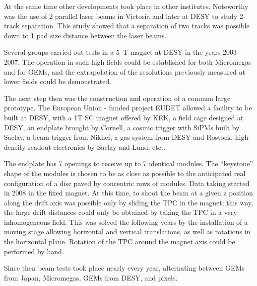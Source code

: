 At the same time other developments took place in other institutes. Noteworthy was the use of 2 parallel laser beams in Victoria and later at DESY to study 2-track separation. This study showed that a separation of two tracks was possible down to 1 pad size distance between the laser beams.

Several groups carried out tests in a \SI{5}{T} magnet at DESY in the years 2003-2007. The operation in such high fields could be established for both Micromegas and for GEMs, and the extrapolation of the resolutions previously measured at lower fields could be demonstrated.

The next step then was the construction and operation of a common large prototype. The European Union - funded project EUDET allowed a facility to be built at DESY, with a 1T SC magnet offered by KEK, a field cage designed at DESY, an endplate brought by Cornell, a cosmic trigger with SiPMs built by Saclay, a beam trigger from Nikhef, a gas system from DESY and Rostock, high density readout electronics by Saclay and Lund, etc..

The endplate has 7 openings to receive up to 7 identical modules. The ``keystone'' shape of the modules is chosen to be as close as possible to the anticipated real configuration of a disc paved by concentric rows of modules. Data taking started in 2008 in the fixed magnet. At this time, to shoot the beam at a given z position along the drift axis was possible only by sliding the TPC in the  magnet; this way, the large drift distances could only be obtained by taking the TPC in a very inhomogeneous field. This was solved the following years by the installation of a moving stage allowing horizontal and vertical translations, as well as rotations in the horizontal plane. Rotation of the TPC around the  magnet axis could be performed by hand.

Since then beam tests took place nearly every year, alternating between GEMs from Japan, Micromegas, GEMs from DESY, and pixels.

%
%







% 
